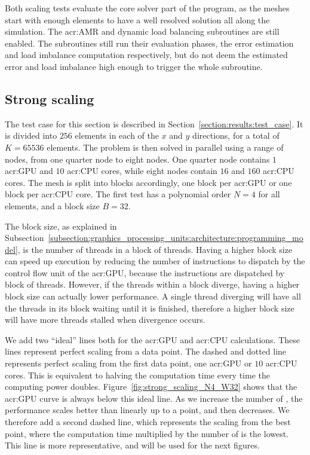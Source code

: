 Both scaling tests evaluate the core solver part of the program, as the meshes start with enough
elements to have a well resolved solution all along the simulation. The \acrlong{acr:AMR} and
dynamic load balancing subroutines are still enabled. The subroutines still run their evaluation
phases, the error estimation and load imbalance computation respectively, but do not deem the
estimated error and load imbalance high enough to trigger the whole subroutine. 

\subsection{Strong scaling}\label{subsection:results:scaling_tests:strong}

The test case for this section is described in Section~\ref{section:results:test_case}. It is
divided into \(256\) elements in each of the \(x\) and \(y\) directions, for a total of \(K =
65536\) elements. The problem is then solved in parallel using a range of nodes, from one quarter
node to eight nodes. One quarter node contains \(1\) \acrshort{acr:GPU} and \(10\)
\acrshort{acr:CPU} cores, while eight nodes contain \(16\)  and \(160\)
\acrshort{acr:CPU} cores. The mesh is split into blocks accordingly, one block per
\acrshort{acr:GPU} or one block per \acrshort{acr:CPU} core. The first test has a polynomial order
\(N = 4\) for all elements, and a block size \(B = 32\). 

The block size, as explained in
Subsection~\ref{subsection:graphics_processing_units:architecture:programming_model}, is the number
of threads in a block of threads. Having a higher block size can speed up execution by reducing the
number of instructions to dispatch by the control flow unit of the \acrshort{acr:GPU}, because the
instructions are dispatched by block of threads. However, if the threads within a block diverge,
having a higher block size can actually lower performance. A single thread diverging will have all
the threads in its block waiting until it is finished, therefore a higher block size will have more
threads stalled when divergence occurs.

We add two ``ideal'' lines both for the \acrshort{acr:GPU} and \acrshort{acr:CPU} calculations.
These lines represent perfect scaling from a data point. The dashed and dotted line represents
perfect scaling from the first data point, one \acrshort{acr:GPU} or \(10\) \acrshort{acr:CPU}
cores. This is equivalent to halving the computation time every time the computing power doubles.
Figure~\ref{fig:strong_scaling_N4_W32} shows that the \acrshort{acr:GPU} curve is always below this
ideal line. As we increase the number of , the performance scales better than
linearly up to a point, and then decreases. We therefore add a second dashed line, which represents
the scaling from the best point, where the computation time multiplied by the number of
 is the lowest. This line is more representative, and will be used for the next
figures.

